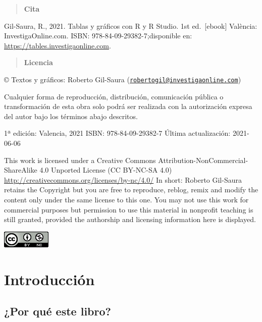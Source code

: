 \documentclass[
]{book}
\begin{document}
\begin{quote}
\textbf{Cita}
\end{quote}

Gil-Saura, R., 2021. Tablas y gráficos con R y R Studio. 1st ed.~{[}ebook{]} València: InvestigaOnline.com. ISBN: 978-84-09-29382-7;disponible en: \url{https://tables.investigaonline.com}.

\begin{quote}
\textbf{Licencia}
\end{quote}

© Textos y gráficos: Roberto Gil-Saura (\href{mailto:robertogil@investigaonline.com}{\nolinkurl{robertogil@investigaonline.com}})

Cualquier forma de reproducción, distribución, comunicación pública o transformación de esta obra solo podrá ser realizada con la autorización expresa del autor bajo los términos abajo descritos.

1ª edición: Valencia, 2021 ISBN: 978-84-09-29382-7 Última actualización: 2021-06-06

This work is licensed under a Creative Commons Attribution-NonCommercial-ShareAlike 4.0 Unported License (CC BY-NC-SA 4.0) \url{http://creativecommons.org/licenses/by-nc/4.0/} In short: Roberto Gil-Saura retains the Copyright but you are free to reproduce, reblog, remix and modify the content only under the same license to this one. You may not use this work for commercial purposes but permission to use this material in nonprofit teaching is still granted, provided the authorship and licensing information here is displayed.

\includegraphics{data/88x31.png}

\hypertarget{tse01}{%
\chapter{Introducción}\label{tse01}}

\hypertarget{por-quuxe9-este-libro}{%
\section{¿Por qué este libro?}\label{por-quuxe9-este-libro}}
\end{document}
